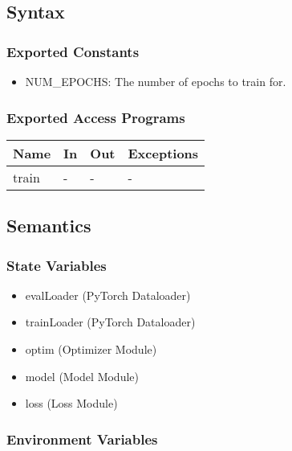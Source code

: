 \documentclass[12pt, titlepage]{article}
\begin{document}
\subsection{Syntax}



\subsubsection{Exported Constants}

\begin{itemize}
  \item NUM\_EPOCHS: The number of epochs to train for.
\end{itemize}

\subsubsection{Exported Access Programs}

\begin{center}
\begin{tabular}{p{2cm}|p{6cm}|p{2cm}|p{2cm}}
\hline
\textbf{Name} & \textbf{In} & \textbf{Out} & \textbf{Exceptions} \\
\hline
train & - & - & - \\
\hline
\end{tabular}
\end{center}

\subsection{Semantics}

\subsubsection{State Variables}
\begin{itemize}
  \item evalLoader (PyTorch Dataloader)
  \item trainLoader (PyTorch Dataloader)
  \item optim (Optimizer Module)
  \item model (Model Module)
  \item loss (Loss Module)
\end{itemize}

\subsubsection{Environment Variables}
\end{document}
